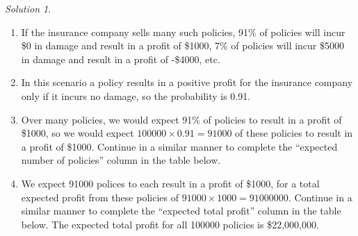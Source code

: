 \documentclass[
  letterpaper,
  DIV=11,
  numbers=noendperiod]{scrreprt}
\theoremstyle{plain}
\theoremstyle{definition}
\theoremstyle{definition}
\theoremstyle{definition}
\theoremstyle{remark}
\newtheorem{refsolution}{Solution}[chapter]
\begin{document}
\begin{tcolorbox}[enhanced jigsaw, opacityback=0, rightrule=.15mm, coltitle=black, colframe=quarto-callout-tip-color-frame, toprule=.15mm, colbacktitle=quarto-callout-tip-color!10!white, opacitybacktitle=0.6, left=2mm, toptitle=1mm, breakable, title={Solution (click to expand)}, bottomtitle=1mm, colback=white, leftrule=.75mm, titlerule=0mm, arc=.35mm, bottomrule=.15mm]

\begin{refsolution}
\leavevmode

\begin{enumerate}
\def\labelenumi{\arabic{enumi}.}
\item
  If the insurance company sells many such policies, 91\% of policies
  will incur \$0 in damage and result in a profit of \$1000, 7\% of
  policies will incur \$5000 in damage and result in a profit of
  -\$4000, etc.
\item
  In this scenario a policy results in a positive profit for the
  insurance company only if it incurs no damage, so the probability is
  0.91.
\item
  Over many policies, we would expect 91\% of policies to result in a
  profit of \$1000, so we would expect \(100000\times 0.91 = 91000\) of
  these policies to result in a profit of \$1000. Continue in a similar
  manner to complete the ``expected number of policies'' column in the
  table below.
\item
  We expect 91000 polices to each result in a profit of \$1000, for a
  total expected profit from these policies of
  \(91000 \times 1000 = 91000000\). Continue in a similar manner to
  complete the ``expected total profit'' column in the table below. The
  expected total profit for all 100000 policies is \$22,000,000.


\end{enumerate}
\end{refsolution}
\end{tcolorbox}
\end{document}

